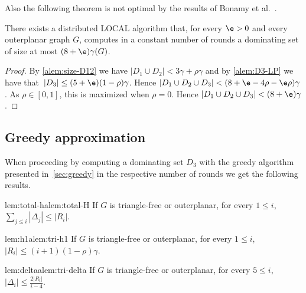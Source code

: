 Also the following theorem is not optimal by the results of Bonamy et al.~\cite{bonamy2021tight}.

\begin{theorem}\label{thm:outer}
  There exists a distributed LOCAL algorithm that, for every $\e>0$ and
  every outerplanar graph
  $G$, computes in a constant number of rounds a
  dominating set of size at most $(8+\e)\gamma(G)$.
\end{theorem}
\begin{proof}
  By \ref{alem:size-D12} we have $|D_1\cup D_2|<3\gamma+\rho\gamma$ and
  by \ref{alem:D3-LP} we have that~$|D_3|\le (5+\e)(1-\rho)\gamma$.
  Hence $|D_1 \cup D_2 \cup D_3| < (8+\e-4\rho-\e\rho)\gamma$.
  As $\rho\in[0,1]$, this is maximized when $\rho=0$. Hence
  \mbox{$|D_1 \cup D_2 \cup D_3|< (8+\e) \gamma$}.
\end{proof}

\subsection{Greedy approximation}

When proceeding by computing a dominating set $D_3$ with the
greedy algorithm presented in~\cref{sec:greedy}
in the respective number of rounds we get the following
results.

\setcounter{lemma}{12} %

\begin{adapted}{lem:total-h}{alem:total-H}
  If $G$ is triangle-free or outerplanar,
  for every $1\le i$, $\sum\limits_{j\le i}|\Delta_j| \le |R_i|$.
\end{adapted}

\begin{adapted}{lem:h1}{alem:tri-h1}
  If $G$ is triangle-free or outerplanar,
  for every $1\le i$, $|R_i| \le (i+1)(1-\rho)\gamma$.
\end{adapted}

\begin{adapted}{lem:delta}{alem:tri-delta}
  If $G$ is triangle-free or outerplanar,
  for every $5\le i$, $|\Delta_i| \le \frac{2|R_i|}{i-4}$.
\end{adapted}

